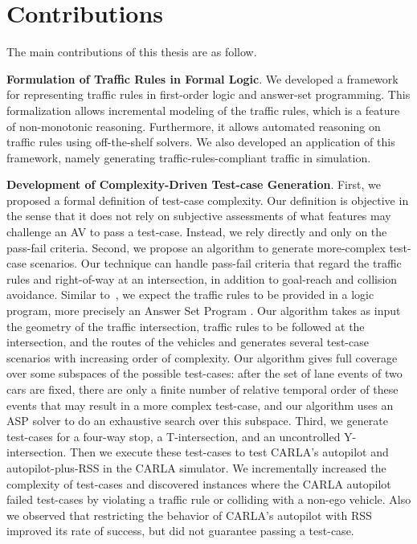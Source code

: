 \section{Contributions}

The main contributions of this thesis are as follow.

\textbf{Formulation of Traffic Rules in Formal Logic}.
We developed a framework for representing traffic rules in first-order logic and answer-set programming.
%
This formalization allows incremental modeling of the traffic rules, which is a feature of non-monotonic reasoning.
%
Furthermore, it allows automated reasoning on traffic rules using off-the-shelf solvers.
%
We also developed an application of this framework, namely generating traffic-rules-compliant traffic in simulation.




\textbf{Development of Complexity-Driven Test-case Generation}.  
First, we proposed a formal definition of test-case complexity.
%
Our definition is objective in the sense that it does not rely on subjective assessments of what features may challenge an AV to pass a test-case.
%
Instead, we rely directly and only on the pass-fail criteria.
%
Second, we propose an algorithm to generate more-complex test-case scenarios.
%
Our technique can handle pass-fail criteria that regard the traffic rules and right-of-way at an intersection, in addition to goal-reach and collision avoidance.
%
Similar to~\cite{Karimi.2020}, we expect the traffic rules to be provided in a logic program, more precisely an Answer Set Program \cite{Lifschitz.2010}.
%
Our algorithm takes as input the geometry of the traffic intersection, traffic rules to be followed at the intersection, and the routes of the vehicles and generates several test-case scenarios with increasing order of complexity.
%
Our algorithm gives full coverage over some subspaces of the possible test-cases: after the set of lane events of two cars are fixed, there are only a finite number of relative temporal order of these events that may result in a more complex test-case, and our algorithm uses an ASP solver to do an exhaustive search over this subspace.
%
Third, we generate test-cases for a four-way stop, a T-intersection, and an uncontrolled Y-intersection.
%
Then we execute these test-cases to test CARLA's autopilot and autopilot-plus-RSS in the CARLA simulator.
%
We incrementally increased the complexity of test-cases and discovered instances where the CARLA autopilot failed test-cases by violating a traffic rule or colliding with a non-ego vehicle.
%
Also we observed that restricting the behavior of CARLA's autopilot with RSS improved its rate of success, but did not guarantee passing a test-case.




